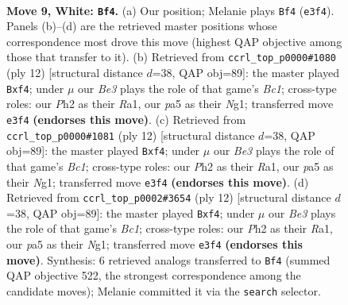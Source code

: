\documentclass[11pt]{article}
\begin{document}
\clearpage

\begin{figure}[p]\centering
\begin{subfigure}{0.46\textwidth}\centering
\resizebox{\linewidth}{!}{%
\newchessgame
\chessboard[
  setfen={rnbqkb1r/1p3p2/3p1np1/p1pP3p/P3P3/2N1B3/1P3PPP/R2QKBNR w KQkq - 0 9},
  showmover=false,
  pgfstyle=straightmove, color=movearrow, markmove={e3-f4}
]}
\caption{}
\end{subfigure}\hfill
\begin{subfigure}{0.46\textwidth}\centering
\resizebox{\linewidth}{!}{%
\newchessgame
\chessboard[
  setfen={rnbqkb1r/pp3p1p/3p1np1/2pP4/2P1Pp2/2N5/PP4PP/R1BQKBNR w KQkq - 0 7},
  showmover=false,
  pgfstyle=straightmove, color=movearrow, markmove={c1-f4}
]}
\caption{}
\end{subfigure}
\\[4pt]
\begin{subfigure}{0.46\textwidth}\centering
\resizebox{\linewidth}{!}{%
\newchessgame
\chessboard[
  setfen={rnbqkb1r/pp3p1p/3p1np1/2pP4/2P1Pp2/2N5/PP4PP/R1BQKBNR w KQkq - 0 7},
  showmover=false,
  pgfstyle=straightmove, color=movearrow, markmove={c1-f4}
]}
\caption{}
\end{subfigure}\hfill
\begin{subfigure}{0.46\textwidth}\centering
\resizebox{\linewidth}{!}{%
\newchessgame
\chessboard[
  setfen={rnbqkb1r/pp3p1p/3p1np1/2pP4/2P1Pp2/2N5/PP4PP/R1BQKBNR w KQkq - 0 7},
  showmover=false,
  pgfstyle=straightmove, color=movearrow, markmove={c1-f4}
]}
\caption{}
\end{subfigure}
\caption{\textbf{Move 9, White: \texttt{Bf4}.} (a) Our position; Melanie plays \texttt{Bf4} (\texttt{e3f4}). Panels (b)--(d) are the retrieved master positions whose correspondence most drove this move (highest QAP objective among those that transfer to it). (b) Retrieved from \texttt{ccrl\_top\_p0000\#1080} (ply 12) [structural distance $d$=38, QAP obj=89]: the master played \texttt{Bxf4}; under $\mu$ our \emph{Be3} plays the role of that game's \emph{Bc1}; cross-type roles: our \emph{P}h2 as their \emph{R}a1, our \emph{p}a5 as their \emph{N}g1; transferred move \texttt{e3f4} \textbf{(endorses this move)}. (c) Retrieved from \texttt{ccrl\_top\_p0000\#1081} (ply 12) [structural distance $d$=38, QAP obj=89]: the master played \texttt{Bxf4}; under $\mu$ our \emph{Be3} plays the role of that game's \emph{Bc1}; cross-type roles: our \emph{P}h2 as their \emph{R}a1, our \emph{p}a5 as their \emph{N}g1; transferred move \texttt{e3f4} \textbf{(endorses this move)}. (d) Retrieved from \texttt{ccrl\_top\_p0002\#3654} (ply 12) [structural distance $d$=38, QAP obj=89]: the master played \texttt{Bxf4}; under $\mu$ our \emph{Be3} plays the role of that game's \emph{Bc1}; cross-type roles: our \emph{P}h2 as their \emph{R}a1, our \emph{p}a5 as their \emph{N}g1; transferred move \texttt{e3f4} \textbf{(endorses this move)}. Synthesis: 6 retrieved analogs transferred to \texttt{Bf4} (summed QAP objective 522, the strongest correspondence among the candidate moves); Melanie committed it via the \texttt{search} selector.}
\label{fig:thought-m16}
\end{figure}
\end{document}
